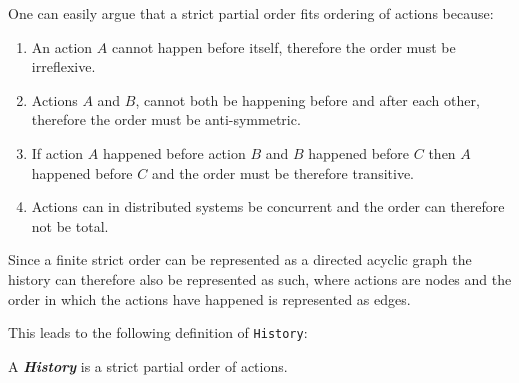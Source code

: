     
	\newpar One can easily argue that a strict partial order fits ordering of actions because:
	\begin{enumerate}
		\item An action $A$ cannot happen before itself, therefore the order must be irreflexive.
		\item Actions $A$ and $B$, cannot both be happening before and after each other, therefore the order must be anti-symmetric.
		\item If action $A$ happened before action $B$ and $B$ happened before $C$ then $A$ happened before $C$ and the order must be therefore transitive.
		\item Actions can in distributed systems be concurrent and the order can therefore not be total.
	\end{enumerate}
	\newpar Since a finite strict order can be represented as a directed acyclic graph the history can therefore also be represented as such, where actions are nodes and the order in which the actions have happened is represented as edges.
	
	\newpar This leads to the following definition of \texttt{History}:
	
	\begin{definition}
		A \textit{\textbf{History}} is a strict partial order of actions.
	\end{definition}
	
